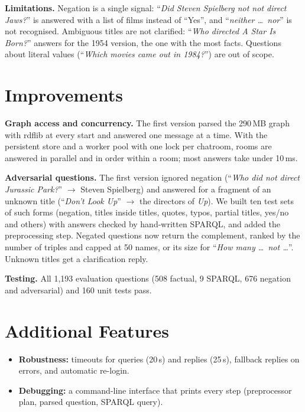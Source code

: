 \documentclass{article}
\begin{document}
\textbf{Limitations.} Negation is a single signal: ``\textit{Did Steven Spielberg not not direct Jaws?}'' is answered with a list of films instead of ``Yes'', and ``\textit{neither \dots\ nor}'' is not recognised. Ambiguous titles are not clarified: ``\textit{Who directed A Star Is Born?}'' answers for the 1954 version, the one with the most facts. Questions about literal values (``\textit{Which movies came out in 1984?}'') are out of scope.

\section{Improvements}

\textbf{Graph access and concurrency.} The first version parsed the 290\,MB graph with rdflib at every start and answered one message at a time. With the persistent store and a worker pool with one lock per chatroom, rooms are answered in parallel and in order within a room; most answers take under 10\,ms.

\textbf{Adversarial questions.} The first version ignored negation (``\textit{Who did not direct Jurassic Park?}'' $\rightarrow$ Steven Spielberg) and answered for a fragment of an unknown title (``\textit{Don't Look Up}'' $\rightarrow$ the directors of \textit{Up}). We built ten test sets of such forms (negation, titles inside titles, quotes, typos, partial titles, yes/no and others) with answers checked by hand-written SPARQL, and added the preprocessing step. Negated questions now return the complement, ranked by the number of triples and capped at 50 names, or its size for ``\textit{How many \dots\ not \dots}''. Unknown titles get a clarification reply.

\textbf{Testing.} All 1,193 evaluation questions (508 factual, 9 SPARQL, 676 negation and adversarial) and 160 unit tests pass.

\section{Additional Features}

\begin{itemize}
    \item \textbf{Robustness:} timeouts for queries (20\,s) and replies (25\,s), fallback replies on errors, and automatic re-login.
    \item \textbf{Debugging:} a command-line interface that prints every step (preprocessor plan, parsed question, SPARQL query).
\end{itemize}



\end{document}

